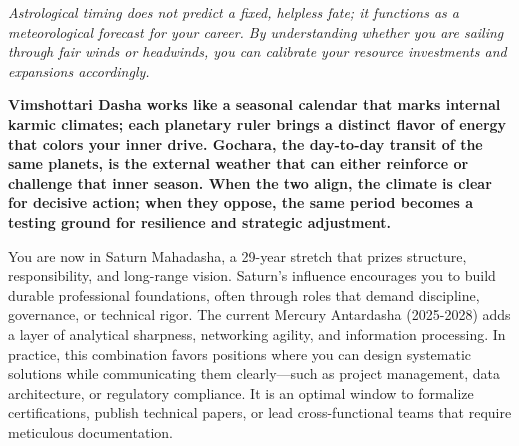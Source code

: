 


{\fontsize{9.5}{14}\selectfont\color{DeepSlate}\itshape Astrological timing does not predict a fixed, helpless fate; it functions as a meteorological forecast for your career. By understanding whether you are sailing through fair winds or headwinds, you can calibrate your resource investments and expansions accordingly.}\par\vspace{3.5mm}

\label{topic54}

{\fontsize{9.5}{13.8}\selectfont\bfseries\color{DeepSlate} Vimshottari Dasha works like a seasonal calendar that marks internal karmic climates; each planetary ruler brings a distinct flavor of energy that colors your inner drive. Gochara, the day-to-day transit of the same planets, is the external weather that can either reinforce or challenge that inner season. When the two align, the climate is clear for decisive action; when they oppose, the same period becomes a testing ground for resilience and strategic adjustment.}\par\vspace{2mm}

{\fontsize{9}{13}\selectfont You are now in Saturn Mahadasha, a 29-year stretch that prizes structure, responsibility, and long-range vision. Saturn's influence encourages you to build durable professional foundations, often through roles that demand discipline, governance, or technical rigor. The current Mercury Antardasha (2025-2028) adds a layer of analytical sharpness, networking agility, and information processing. In practice, this combination favors positions where you can design systematic solutions while communicating them clearly---such as project management, data architecture, or regulatory compliance. It is an optimal window to formalize certifications, publish technical papers, or lead cross-functional teams that require meticulous documentation.}\par\vspace{1.8mm}

